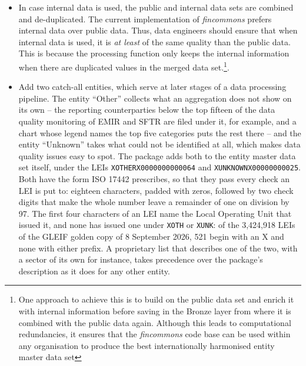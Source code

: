 \begin{itemize}
	\item In case internal data is used, the public and internal data sets are combined and de-duplicated. The current implementation of \emph{fincommons} prefers internal data over public data. Thus, data engineers should ensure that when internal data is used, it is \emph{at least} of the same quality than the public data. This is because the processing function only keeps the internal information when there are duplicated values in the merged data set.\footnote{One approach to achieve this is to build on the public data set and enrich it with internal information before saving in the Bronze layer from where it is combined with the public data again. Although this leads to computational redundancies, it ensures that the \emph{fincommons} code base can be used within any organisation to produce the best internationally harmonised entity master data set}.
	\item Add two catch-all entities, which serve at later stages of a data processing pipeline. The entity ``Other'' collects what an aggregation does not show on its own -- the reporting counterparties below the top fifteen of the data quality monitoring of EMIR and SFTR are filed under it, for example, and a chart whose legend names the top five categories puts the rest there -- and the entity ``Unknown'' takes what could not be identified at all, which makes data quality issues easy to spot. The package adds both to the entity master data set itself, under the LEIs \verb|XOTHERX0000000000064| and \verb|XUNKNOWNX00000000025|. Both have the form ISO 17442 prescribes, so that they pass every check an LEI is put to: eighteen characters, padded with zeros, followed by two check digits that make the whole number leave a remainder of one on division by 97. The first four characters of an LEI name the Local Operating Unit that issued it, and none has issued one under \verb|XOTH| or \verb|XUNK|: of the 3,424,918 LEIs of the GLEIF golden copy of 8 September 2026, 521 begin with an X and none with either prefix. A proprietary list that describes one of the two, with a sector of its own for instance, takes precedence over the package's description as it does for any other entity.
\end{itemize}


